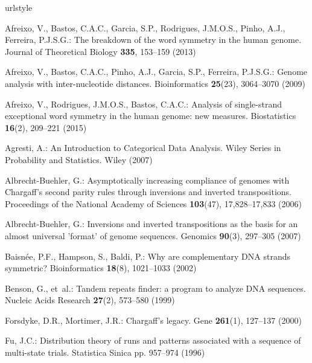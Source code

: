 \documentclass[review,12pt]{elsarticle}
\begin{document}
\begin{thebibliography}{10}
\providecommand{\url}[1]{{#1}}
\providecommand{\urlprefix}{URL }
\expandafter\ifx\csname urlstyle\endcsname\relax
  \providecommand{\doi}[1]{DOI~\discretionary{}{}{}#1}\else
  \providecommand{\doi}{DOI~\discretionary{}{}{}\begingroup
  \urlstyle{rm}\Url}\fi

Afreixo, V., Bastos, C.A.C., Garcia, S.P., Rodrigues, J.M.O.S., Pinho, A.J.,
  Ferreira, P.J.S.G.: The breakdown of the word symmetry in the human genome.
\newblock Journal of Theoretical Biology \textbf{335}, 153--159 (2013)

Afreixo, V., Bastos, C.A.C., Pinho, A.J., Garcia, S.P., Ferreira, P.J.S.G.:
  Genome analysis with inter-nucleotide distances.
\newblock Bioinformatics \textbf{25}(23), 3064--3070 (2009)

Afreixo, V., Rodrigues, J.M.O.S., Bastos, C.A.C.: Analysis of single-strand
  exceptional word symmetry in the human genome: new measures.
\newblock Biostatistics \textbf{16}(2), 209--221 (2015)

Agresti, A.: An Introduction to Categorical Data Analysis.
\newblock Wiley Series in Probability and Statistics. Wiley (2007)

Albrecht-Buehler, G.: Asymptotically increasing compliance of genomes with
  {C}hargaff's second parity rules through inversions and inverted
  transpositions.
\newblock Proceedings of the National Academy of Sciences \textbf{103}(47),
  17,828--17,833 (2006)

Albrecht-Buehler, G.: Inversions and inverted transpositions as the basis for
  an almost universal 'format' of genome sequences.
\newblock Genomics \textbf{90}(3), 297--305 (2007)

Baisn{\'e}e, P.F., Hampson, S., Baldi, P.: Why are complementary {DNA} strands
  symmetric?
\newblock Bioinformatics \textbf{18}(8), 1021--1033 (2002)

Benson, G., et~al.: Tandem repeats finder: a program to analyze {DNA}
  sequences.
\newblock Nucleic Acids Research \textbf{27}(2), 573--580 (1999)

Forsdyke, D.R., Mortimer, J.R.: Chargaff's legacy.
\newblock Gene \textbf{261}(1), 127--137 (2000)

Fu, J.C.: Distribution theory of runs and patterns associated with a sequence
  of multi-state trials.
\newblock Statistica Sinica pp. 957--974 (1996)


\end{thebibliography}
\end{document}
